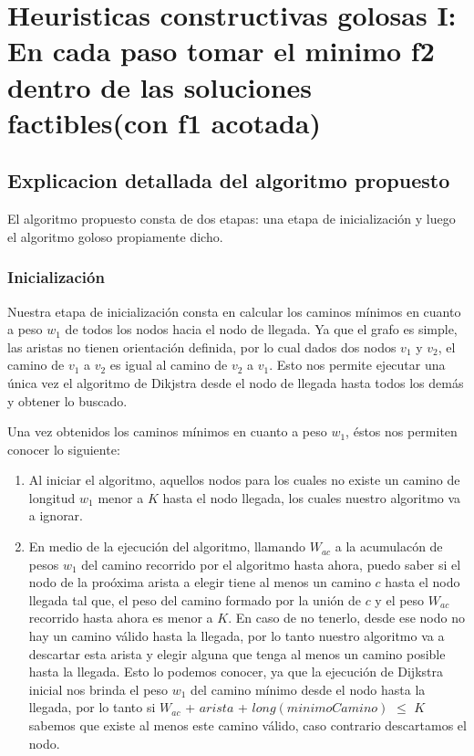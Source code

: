 \section{Heuristicas constructivas golosas I: En cada paso tomar el minimo f2 dentro de las soluciones factibles(con f1 acotada)}
\subsection{Explicacion detallada del algoritmo propuesto}

El algoritmo propuesto consta de dos etapas: una etapa de inicializaci\'on y luego el algoritmo goloso propiamente dicho.

\subsubsection{Inicializaci\'on}

Nuestra etapa de inicializaci\'on consta en calcular los caminos m\'inimos en cuanto a peso $w_1$ de todos los nodos hacia el nodo de llegada. Ya que el grafo es simple, las aristas no tienen orientaci\'on definida, por lo cual dados dos nodos $v_1$ y $v_2$, el camino de $v_1$ a $v_2$ es igual al camino de $v_2$ a $v_1$. Esto nos permite ejecutar una \'unica vez el algoritmo de Dikjstra desde el nodo de llegada hasta todos los dem\'as y obtener lo buscado.

\vspace{2mm}

Una vez obtenidos los caminos m\'inimos en cuanto a peso $w_1$, \'estos nos permiten conocer lo siguiente:

\begin{enumerate}
\item Al iniciar el algoritmo, aquellos nodos para los cuales no existe un camino de longitud $w_1$ menor a $K$ hasta el nodo llegada, los cuales nuestro algoritmo va a ignorar.
\item En medio de la ejecuci\'on del algoritmo, llamando $W_{ac}$ a la acumulac\'on de pesos $w_1$ del camino recorrido por el algoritmo hasta ahora, puedo saber si el nodo de la pro\'oxima arista a elegir tiene al menos un camino $c$ hasta el nodo llegada tal que, el peso del camino formado por la uni\'on de $c$ y el peso $W_{ac}$ recorrido hasta ahora es menor a $K$. En caso de no tenerlo, desde ese nodo no hay un camino v\'alido hasta la llegada, por lo tanto nuestro algoritmo va a descartar esta arista y elegir alguna que tenga al menos un camino posible hasta la llegada. Esto lo podemos conocer, ya que la ejecuci\'on de Dijkstra inicial nos brinda el peso $w_1$ del camino m\'inimo desde el nodo hasta la llegada, por lo tanto  si $W_{ac}$ + $arista$ + $long(minimoCamino)$ $\leq$ $K$ sabemos que existe al menos este camino v\'alido, caso contrario descartamos el nodo.
\end{enumerate}

